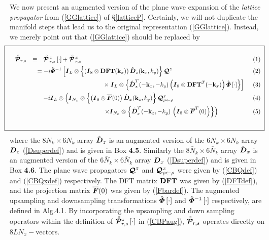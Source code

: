 We now present an augmented version of the plane wave expansion of the
{\em lattice propagator\/} from   (\ref{GGlattice}) of 
\S\ref{latticeP}.
 Certainly, we will not duplicate the manifold steps 
that lead us to the original representation (\ref{GGlattice}). Instead, 
we merely point out that  (\ref{GGlattice}) should be replaced by
\[
\!\!\!\!\!\!\fbox{
\begin{minipage} {146.0mm}
\begin{samepage}
\begin{eqnarray}\label{CBPaug}
\!\!\!\!\!\!\!\!\!
\rf{\CB P}_{r,s} &\equiv&
\rf{\CB P}\!{}_{r,s}^{z}\left[ \cdot \right]+ \rf{\CB  P}\!{}_{r,s}^{x}\nonumber\\
&&\!\!\!\!\!\!= -i\hat{\bmi \Phi}{}^{-1}\left[  {\bmi I}_L \otimes\left\{\left({\bmi I}_{8}\otimes 
{\bf DFT}({\bf k}_{x}) \right)\hat{\bmi  D}_{z}({\bf k}_{x},{k}_{y})\right\}
 {\CB Q}^{z}\right.\nonumber\\
&&\qquad\qquad\qquad\qquad\qquad
\times \left.
 {\bmi I}_L \otimes \left\{
\hat{\bmi  D}^{T}_{z}(-{\bf k}_{x},-{k}_{y})\left({\bmi I}_{8}\otimes
{\bf DFT}^{T}(-{\bf k}_{x})  \right)  \hat{\bmi \Phi}\left[ \cdot \right] \right\}\right]\nonumber\\
&&
 -{i}{\bmi I}_L \otimes\left( {\bmi I}_{N_x} \otimes
\left\{\left({\bmi I}_{8}\otimes \overline{\bmi F}(0)  \right)
 \hat{\bmi  D}_{x}({\bf k}_{z},{k}_{y})\right\}
 {\CB Q}{}^{x}_{\rho \leftarrow \rho}
\right.\nonumber\\
&&\qquad\qquad\qquad\qquad\qquad
\left.
\times{\bmi I}_{N_x} \otimes \left\{\hat{\bmi  D}_{x}^{T}(-{\bf k}_{z},-{k}_{y})
\,\left({\bmi I}_{8}\otimes \overline{\bmi F}^{T}(0)  \right)
\right\} \right)
\end{eqnarray}
\end{samepage}
\vspace{1 mm}
\end{minipage}
}
\]
where the $8 N_k \times 6 N_k$ array $\hat{\mbox{\boldmath$\mit D$\unboldmath}}_{z}$  is an augmented version
 of the $6 N_k \times 6 N_k$ array 
${\mbox{\boldmath$\mit D$\unboldmath}}_{z}$ (\ref{Dsuperdef}) and is given in {\sc Box } {\bf 4.5}.
Similarly the $8 \bar{N}_k \times 6 \bar{N}_k$ array $\hat{\mbox{\boldmath$\mit D$\unboldmath}}_{x}$  is an augmented version
 of the $6 \bar{N}_k \times 6 \bar{N}_k$ array 
${\mbox{\boldmath$\mit D$\unboldmath}}_{x}$ (\ref{Dsuperdef}) and is given in {\sc Box } {\bf 4.6}. 
The plane wave propagators ${\mbox{\boldmath$\cal Q$\unboldmath}}^{z}$ and ${\mbox{\boldmath$\cal Q$\unboldmath}}{}^{x}_{\rho \leftarrow \rho}$
were given by (\ref{CBQdef}) and (\ref{CBQxdef}) respectively.
The DFT matrix  ${\bf DFT}$  was given by (\ref{DFTdef}), and the 
projection matrix $\overline{\mbox{\boldmath$\mit F$\unboldmath}}(0)$ was given by (\ref{Fbardef}).
The augmented upsampling and downsampling transformations
$\hat{\mbox{\boldmath$\mit \Phi$\unboldmath}}\left[ \cdot \right]$ and $\hat{\mbox{\boldmath$\mit \Phi$\unboldmath}}{}^{-1}\left[ \cdot \right]$
respectively, are defined in Alg.4.1. By incorporating the upsampling and 
down sampling operators within the definition of $\stackrel{\scriptscriptstyle _{\,\,\circ}}{ \mbox{\boldmath$\cal P$\unboldmath}}\!\!{}_{r,s}^{z}\left[ \cdot \right]$ in (\ref{CBPaug}),  $\stackrel{\scriptscriptstyle _{\,\,\circ}}{ \mbox{\boldmath$\cal P$\unboldmath}}\!\!{}_{r,s}$ operates directly on $8 L N_x-$vectors.

